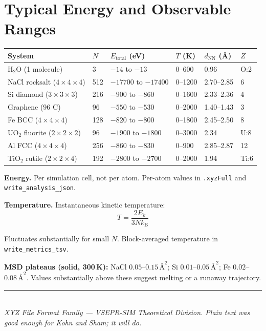 \documentclass[11pt, a4paper, oneside]{article}
\newcommand{\ang}{\text{\AA}}
\newcommand{\kB}{k_{\mathrm{B}}}
\begin{document}
\section{Typical Energy and Observable Ranges}
\label{sec:ranges}

\begin{center}
\begin{tabular}{llllll}
  \toprule
  System & $N$ & $E_{\mathrm{total}}$ (eV) & $T$ (K) & $d_{\mathrm{NN}}$ (\AA) & $\bar{Z}$ \\
  \midrule
  H$_2$O (1 molecule)              & 3   & $-14$ to $-13$         & 0--600  & 0.96       & O:2 \\
  NaCl rocksalt ($4{\times}4{\times}4$)& 512 & $-17700$ to $-17400$ & 0--1200 & 2.70--2.85 & 6 \\
  Si diamond ($3{\times}3{\times}3$)   & 216 & $-900$ to $-860$     & 0--1600 & 2.33--2.36 & 4 \\
  Graphene (96 C)                  & 96  & $-550$ to $-530$       & 0--2000 & 1.40--1.43 & 3 \\
  Fe BCC ($4{\times}4{\times}4$)   & 128 & $-820$ to $-800$       & 0--1800 & 2.45--2.50 & 8 \\
  UO$_2$ fluorite ($2{\times}2{\times}2$)& 96 & $-1900$ to $-1800$ & 0--3000 & 2.34       & U:8 \\
  Al FCC ($4{\times}4{\times}4$)   & 256 & $-860$ to $-830$       & 0--900  & 2.85--2.87 & 12 \\
  TiO$_2$ rutile ($2{\times}2{\times}4$)& 192& $-2800$ to $-2700$  & 0--2000 & 1.94       & Ti:6 \\
  \bottomrule
\end{tabular}
\end{center}

\medskip
\noindent\textbf{Energy.} Per simulation cell, not per atom. Per-atom values
in \texttt{.xyzFull} and \texttt{write\_analysis\_json}.

\medskip
\noindent\textbf{Temperature.} Instantaneous kinetic temperature:
\begin{equation}
  T = \frac{2 E_k}{3 N \kB}
  \label{eq:T_kin}
\end{equation}

Fluctuates substantially for small $N$. Block-averaged temperature in
\texttt{write\_metrics\_tsv}.

\medskip
\noindent\textbf{MSD plateaus (solid, 300\,K):}
NaCl $0.05$--$0.15\,\ang^2$;
Si $0.01$--$0.05\,\ang^2$;
Fe $0.02$--$0.08\,\ang^2$.
Values substantially above these suggest melting or a runaway trajectory.

\vfill
\begin{center}
  \rule{0.4\textwidth}{0.4pt}\\[0.5em]
  \textit{XYZ File Format Family --- VSEPR-SIM Theoretical Division.
  Plain text was good enough for Kohn and Sham; it will do.}
\end{center}
\end{document}

